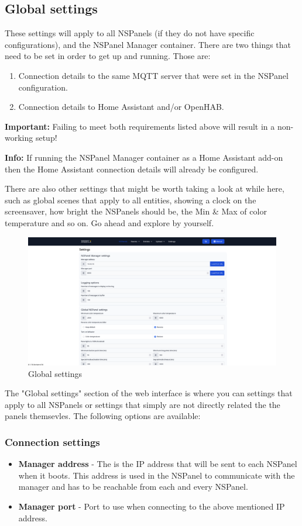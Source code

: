 \documentclass[10pt]{article}
\newcommand{\info}[1]{\begin{infoBox} \textbf{Info:} #1 \end{infoBox}}
\newcommand{\important}[1]{\begin{importantBox} \textbf{Important:} #1 \end{importantBox}}
\begin{document}
    \hypertarget{sec:global_settings}{}
    \subsection{Global settings}
    These settings will apply to all NSPanels (if they do not have specific configurations), and the NSPanel Manager container. There are two things that need to be set in order to get up and running. Those are:
    \begin{enumerate}
      \item Connection details to the same MQTT server that were set in the NSPanel configuration.
      \item Connection details to Home Assistant and/or OpenHAB.
    \end{enumerate}
    \important{Failing to meet both requirements listed above will result in a non-working setup!}
    \info{If running the NSPanel Manager container as a Home Assistant add-on then the Home Assistant connection details will already be configured.}
    There are also other settings that might be worth taking a look at while here, such as global scenes that apply to all entities, showing a clock on the screensaver, how bright the NSPanels should be, the Min \& Max of color temperature and so on. Go ahead and explore by yourself.
    \begin{figure}[H]
    \centering
    \includegraphics[scale=0.25]{settings_page.png}
    \caption{Global settings}%
    \end{figure}

    The "Global settings" section of the web interface is where you can settings that apply to all NSPanels or settings that simply are not directly related the the panels themsevles. The following options are available:
    \subsubsection{Connection settings}
    \begin{itemize}
      \item \textbf{Manager address} - The is the IP address that will be sent to each NSPanel when it boots. This address is used in the NSPanel to communicate with the manager and has to be reachable from each and every NSPanel.
      \item \textbf{Manager port} - Port to use when connecting to the above mentioned IP address.
    \end{itemize}
\end{document}
